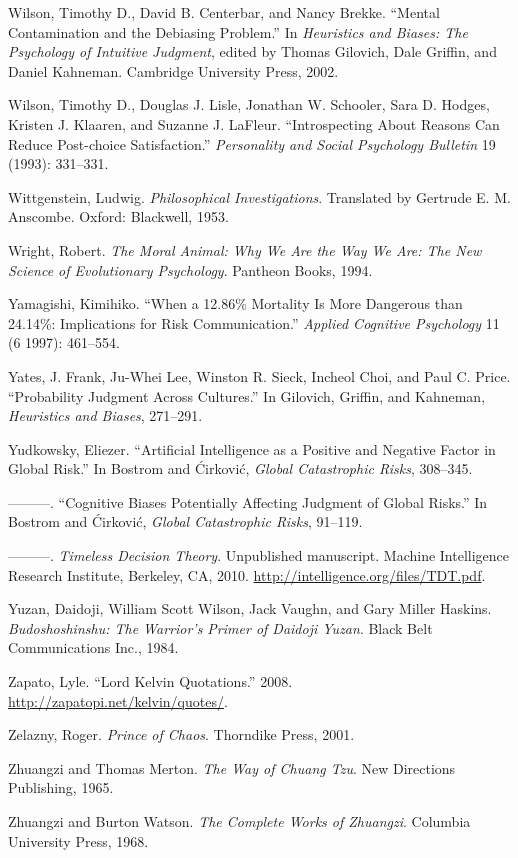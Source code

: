 \documentclass[letterpaper]{book}
\begin{document}
{
 Wilson, Timothy D., David B. Centerbar, and Nancy Brekke.
``Mental Contamination and the Debiasing
Problem.'' In \textit{Heuristics and Biases: The
Psychology of Intuitive Judgment}, edited by Thomas Gilovich, Dale
Griffin, and Daniel Kahneman. Cambridge University Press, 2002.}

{
 Wilson, Timothy D., Douglas J. Lisle, Jonathan W. Schooler, Sara
D. Hodges, Kristen J. Klaaren, and Suzanne J. LaFleur.
``Introspecting About Reasons Can Reduce Post-choice
Satisfaction.'' \textit{Personality and Social
Psychology Bulletin} 19 (1993): 331--331.}

{
 Wittgenstein, Ludwig. \textit{Philosophical Investigations}.
Translated by Gertrude E. M. Anscombe. Oxford: Blackwell, 1953.}

{
 Wright, Robert. \textit{The Moral Animal: Why We Are the Way We
Are: The New Science of Evolutionary Psychology}. Pantheon Books,
1994.}

{
 Yamagishi, Kimihiko. ``When a 12.86\% Mortality
Is More Dangerous than 24.14\%: Implications for Risk
Communication.'' \textit{Applied Cognitive
Psychology} 11 (6 1997): 461--554.}

{
 Yates, J. Frank, Ju-Whei Lee, Winston R. Sieck, Incheol Choi, and
Paul C. Price. ``Probability Judgment Across
Cultures.'' In Gilovich, Griffin, and Kahneman,
\textit{Heuristics and Biases}, 271--291.}

{
 Yudkowsky, Eliezer. ``Artificial Intelligence as
a Positive and Negative Factor in Global Risk.'' In
Bostrom and \'Cirkovi\'c, \textit{Global Catastrophic Risks},
308--345.}

{
 {}---{}---{}---. ``Cognitive Biases Potentially
Affecting Judgment of Global Risks.'' In Bostrom and
\'Cirkovi\'c, \textit{Global Catastrophic Risks}, 91--119.}

{
 {}---{}---{}---. \textit{Timeless Decision Theory}. Unpublished
manuscript. Machine Intelligence Research Institute, Berkeley, CA,
2010. \url{http://intelligence.org/files/TDT.pdf}.}

{
 Yuzan, Daidoji, William Scott Wilson, Jack Vaughn, and Gary Miller
Haskins. \textit{Budoshoshinshu: The Warrior's Primer
of Daidoji Yuzan}. Black Belt Communications Inc., 1984.}

{
 Zapato, Lyle. ``Lord Kelvin
Quotations.'' 2008.
\url{http://zapatopi.net/kelvin/quotes/}.}

{
 Zelazny, Roger. \textit{Prince of Chaos}. Thorndike Press, 2001.}

{
 Zhuangzi and Thomas Merton. \textit{The Way of Chuang Tzu}. New
Directions Publishing, 1965.}

{
 Zhuangzi and Burton Watson. \textit{The Complete Works of
Zhuangzi}. Columbia University Press, 1968.}


\bigskip


\bigskip

\clearpage
\bigskip
\end{document}
